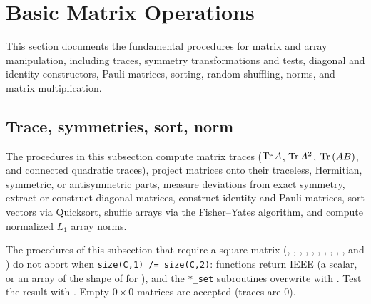 \section{Basic Matrix Operations}
\label{sec:basic_matrix_ops}

This section documents the fundamental procedures for matrix and array manipulation, including traces, symmetry transformations and tests, diagonal and identity constructors, Pauli matrices, sorting, random shuffling, norms, and matrix multiplication.

\subsection{Trace, symmetries, sort, norm}
\label{subsec:trace_sym_sort_norm}

The procedures in this subsection compute matrix traces (${\rm Tr\,} A$, ${\rm Tr\,} A^2$, ${\rm Tr\,}(AB)$, and connected quadratic traces), project matrices onto their traceless, Hermitian, symmetric, or antisymmetric parts, measure deviations from exact symmetry, extract or construct diagonal matrices, construct identity and Pauli matrices, sort vectors via Quicksort, shuffle arrays via the Fisher--Yates algorithm, and compute normalized $L_1$ array norms.

\begin{notebox}
The procedures of this subsection that require a square matrix (, , , , , , , , , , and ) do not abort when \texttt{size(C,1) /= size(C,2)}: functions return IEEE  (a scalar, or an array of the shape of  for ), and the \texttt{*\_set} subroutines overwrite  with . Test the result with . Empty $0\times 0$ matrices are accepted (traces are $0$).
\end{notebox}


